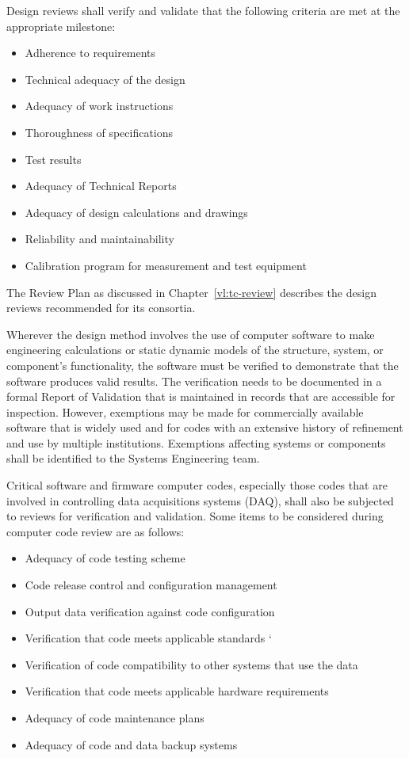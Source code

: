 Design reviews shall verify and validate that the following criteria
are met at the appropriate milestone:
\begin{itemize}
 \item Adherence to requirements
 \item Technical adequacy of the design
 \item Adequacy of work instructions
 \item Thoroughness of specifications
 \item Test results
 \item Adequacy of Technical Reports
 \item Adequacy of design calculations and drawings
 \item Reliability and maintainability
 \item Calibration program for measurement and test equipment
\end{itemize}
The  Review Plan as discussed in
Chapter~\ref{vl:tc-review} describes the design reviews recommended
for its consortia.

Wherever the design method involves the use of
computer software to make engineering calculations or static dynamic
models of the structure, system, or component's functionality, the
software must be verified to demonstrate that the software produces
valid results. The verification needs to be documented in a formal
Report of Validation that is maintained in records that are accessible
for inspection. However, exemptions may be made for commercially
available software that is widely used and for codes with an extensive
history of refinement and use by multiple institutions. Exemptions
affecting systems or components shall be identified to the
 Systems Engineering team.

Critical software and firmware computer codes, especially those codes
that are involved in controlling  data acquisitions
systems (DAQ), shall also be subjected to reviews for verification and
validation. Some items to be considered during computer code review
are as follows:
\begin{itemize}
\item Adequacy of code testing scheme
\item Code release control and configuration management
  \item Output data verification against code configuration
  \item Verification that code meets applicable standards `
  \item Verification of code compatibility to other systems that use
    the data
  \item Verification that code meets applicable hardware requirements
  \item Adequacy of code maintenance plans
  \item Adequacy of code and data backup systems
\end{itemize}

